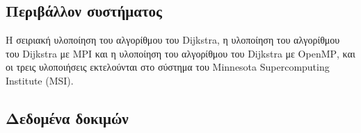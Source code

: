 \documentclass[12pt,a4paper]{article}
\begin{document}
\subsection{Περιβάλλον συστήματος}

Η σειριακή υλοποίηση του αλγορίθμου του \foreignlanguage{english}{Dijkstra}, η υλοποίηση του αλγορίθμου του \foreignlanguage{english}{Dijkstra} με \foreignlanguage{english}{MPI} και η υλοποίηση του αλγορίθμου του \foreignlanguage{english}{Dijkstra} με
\foreignlanguage{english}{OpenMP}, και οι τρεις υλοποιήσεις εκτελούνται στο σύστημα του \foreignlanguage{english}{Minnesota Supercomputing
Institute (MSI)}.
\vspace{0.2cm}

\subsection{Δεδομένα δοκιμών}
\end{document}
